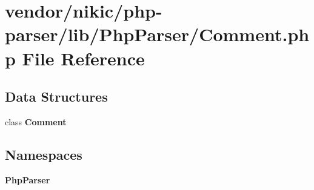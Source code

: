 \section{vendor/nikic/php-\/parser/lib/\+Php\+Parser/\+Comment.php File Reference}
\label{_comment_8php}
\subsection*{Data Structures}
\begin{DoxyCompactItemize}
\item 
class {\bf Comment}
\end{DoxyCompactItemize}
\subsection*{Namespaces}
\begin{DoxyCompactItemize}
\item 
 {\bf Php\+Parser}
\end{DoxyCompactItemize}
